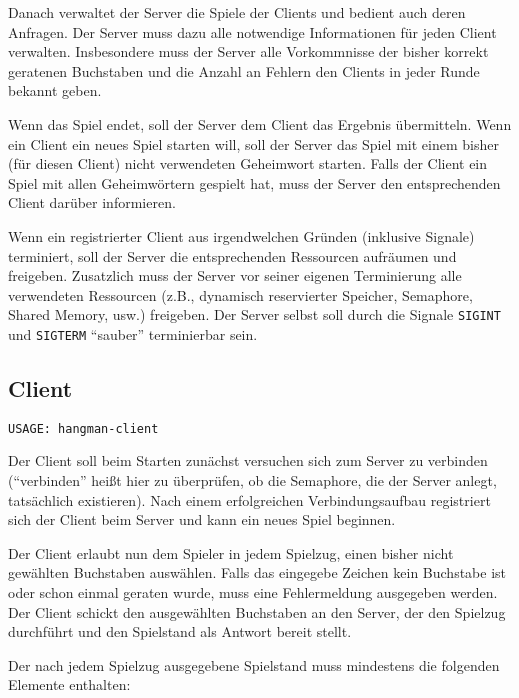 Danach verwaltet der Server die Spiele der Clients und bedient auch deren
Anfragen.  Der Server muss dazu alle notwendige Informationen für jeden Client
verwalten. Insbesondere muss der Server alle Vorkommnisse der bisher korrekt
geratenen Buchstaben und die Anzahl an Fehlern den Clients in jeder Runde
bekannt geben.

Wenn das Spiel endet, soll der Server dem Client das Ergebnis übermitteln.
Wenn ein Client ein neues Spiel starten will, soll der Server das Spiel mit
einem bisher (für diesen Client) nicht verwendeten Geheimwort starten.  Falls
der Client ein Spiel mit allen Geheimwörtern gespielt hat, muss der Server den
entsprechenden Client darüber informieren.

Wenn ein registrierter Client aus irgendwelchen Gründen (inklusive Signale)
terminiert, soll der Server die entsprechenden Ressourcen aufräumen und
freigeben.  Zusatzlich muss der Server vor seiner eigenen Terminierung alle
verwendeten Ressourcen (z.B., dynamisch reservierter Speicher, Semaphore,
Shared Memory, usw.) freigeben.  Der Server selbst soll durch die Signale
\verb|SIGINT| und \verb|SIGTERM| "`sauber"' terminierbar sein.



\subsection*{Client}

\begin{verbatim}
USAGE: hangman-client
\end{verbatim}

Der Client soll beim Starten zunächst versuchen sich zum Server zu verbinden
("`verbinden"' heißt hier zu überprüfen, ob die Semaphore, die der Server
anlegt, tatsächlich existieren).  Nach einem erfolgreichen Verbindungsaufbau
registriert sich der Client beim Server und kann ein neues Spiel beginnen.

Der Client erlaubt nun dem Spieler in jedem Spielzug, einen bisher nicht
gewählten Buchstaben auswählen.  Falls das eingegebe Zeichen kein Buchstabe ist
oder schon einmal geraten wurde, muss eine Fehlermeldung ausgegeben werden. Der
Client schickt den ausgewählten Buchstaben an den Server, der den Spielzug
durchführt und den Spielstand als Antwort bereit stellt.

Der nach jedem Spielzug ausgegebene Spielstand muss mindestens die folgenden
Elemente enthalten:

